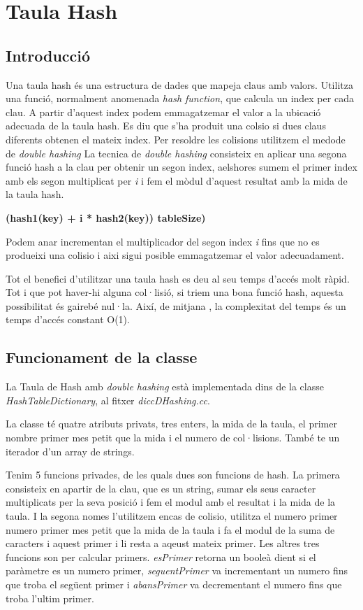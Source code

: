 \documentclass[titlepage]{article}
\begin{document}
\clearpage
\section{Taula Hash}
\subsection{Introducció}
Una taula hash és una estructura de dades que mapeja claus amb valors. Utilitza una funció, normalment anomenada \textit{hash function}, que calcula un index per cada clau. A partir d'aquest index podem emmagatzemar el valor a la ubicació adecuada de la taula hash. Es diu que s'ha produit una colsio si dues claus diferents obtenen el mateix index. Per resoldre les colisions utilitzem el medode de \textit{double hashing}
La tecnica de \textit{double hashing} consisteix en aplicar una segona funció hash a la clau per obtenir un segon index, aelshores sumem el primer index amb els segon multiplicat per \textit{i} i fem el mòdul d'aquest resultat amb la mida de la taula hash.

 \begin{center} \textbf{(hash1(key) + i * hash2(key)) tableSize)}    \end{center}

Podem anar incrementan el multiplicador del segon index  \textit{i} fins que no es produeixi una colisio i aixi sigui posible emmagatzemar el valor adecuadament.
\newline\par
Tot el benefici d'utilitzar una taula hash es deu al seu temps d'accés molt ràpid. Tot i que pot haver-hi alguna col·lisió, si triem una bona funció hash, aquesta possibilitat és gairebé nul·la.
Així, de mitjana , la complexitat del temps és un temps d'accés constant O(1). 


\subsection{Funcionament de la classe}
La Taula de Hash amb \textit{double hashing} està implementada dins de la classe \textit{HashTableDictionary}, al fitxer \textit{diccDHashing.cc}.
\newline\par
La classe té quatre atributs privats, tres enters, la mida de la taula, el primer nombre primer mes petit que la mida i el numero de col·lisions. També te un iterador d'un array de strings.
\newline\par
Tenim 5 funcions privades, de les quals dues son funcions de hash.
La primera consisteix en apartir de la clau, que es un string, sumar els seus caracter multiplicats per la seva posició i fem el modul amb el resultat i la mida de la taula. I la segona nomes l'utilitzem encas de colisio, utilitza el numero primer numero primer mes petit que la mida de la taula i fa el modul de la suma de caracters i aquest primer i li resta a aqeust mateix primer. 
Les altres tres funcions son per calcular primers. \textit{esPrimer} retorna un booleà dient si el paràmetre es un numero primer, \textit{seguentPrimer} va incrementant un numero fins que troba el següent primer i \textit{abansPrimer} va decrementant el numero fins que troba l'ultim primer.
\end{document}
